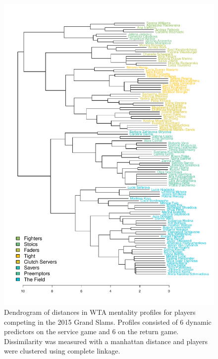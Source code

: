 \documentclass{Latex/svjour3}
\begin{document}
\begin{figure}
\includegraphics[scale=0.9]{figs/wta_dendro_std_fixed.pdf}
\caption{Dendrogram of distances in WTA mentality profiles for players
competing in the 2015 Grand Slams. Profiles consisted of 6 dynamic
predictors on the service game and 6 on the return game. Dissimilarity
was measured with a manhattan distance and players were clustered
using complete linkage.}
\label{fig:wta_dendro}
\end{figure}

\clearpage
\end{document}
